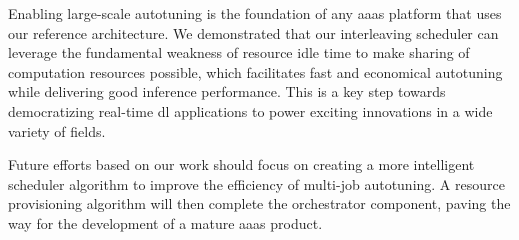 Enabling large-scale autotuning is the foundation of any \gls{aaas} platform that uses our reference architecture. We demonstrated that our interleaving scheduler can leverage the fundamental weakness of resource idle time to make sharing of computation resources possible, which facilitates fast and economical autotuning while delivering good inference performance. This is a key step towards democratizing real-time \gls{dl} applications to power exciting innovations in a wide variety of fields.

Future efforts based on our work should focus on creating a more intelligent scheduler algorithm to improve the efficiency of multi-job autotuning. A resource provisioning algorithm will then complete the orchestrator component, paving the way for the development of a mature \gls{aaas} product.
